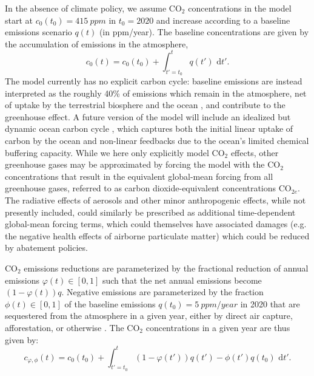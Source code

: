 \documentclass{article}
\begin{document}
In the absence of climate policy, we assume CO$_{2}$ concentrations in the model start at $c_{0}(t_{0}) = \SI{415}{ppm}$ in $t_{0}=2020$ and increase according to a baseline emissions scenario $q(t)$ (in ppm/year). The baseline concentrations are given by the accumulation of emissions in the atmosphere,
\begin{equation}
c_{0}(t) = c_{0}(t_{0}) + \int_{t'=t_{0}}^{t} q(t') \text{ d}t'.
\end{equation}
The model currently has no explicit carbon cycle: baseline emissions are instead interpreted as the roughly 40\% of emissions which remain in the atmosphere, net of uptake by the terrestrial biosphere and the ocean \citep{}, and contribute to the greenhouse effect. A future version of the model will include an idealized but dynamic ocean carbon cycle \citep[e.g.][]{Glotter2014}, which captures both the initial linear uptake of carbon by the ocean and non-linear feedbacks due to the ocean's limited chemical buffering capacity. While we here only explicitly model CO$_{2}$ effects, other greenhouse gases may be approximated by forcing the model with the CO$_{2}$ concentrations that result in the equivalent global-mean forcing from all greenhouse gases, referred to as carbon dioxide-equivalent concentrations CO$_{2e}$. The radiative effects of aerosols and other minor anthropogenic effects, while not presently included, could similarly be prescribed as additional time-dependent global-mean forcing terms, which could themselves have associated damages (e.g. the negative health effects of airborne particulate matter) which could be reduced by abatement policies.

CO$_{2}$ emissions reductions are parameterized by the fractional reduction of annual emissions $\varphi(t) \in [0,1]$ such that the net annual emissions become $(1-\varphi(t))q$. Negative emissions are parameterized by the fraction $\phi(t) \in [0,1]$ of the baseline emissions $q(t_{0}) = \SI{5}{ppm/year}$ in 2020 that are sequestered from the atmosphere in a given year, either by direct air capture, afforestation, or otherwise \citep{}. The CO$_{2}$ concentrations in a given year are thus given by:
\begin{equation}
    c_{\varphi, \phi}(t) = c_{0}(t_{0}) + \int_{t'=t_{0}}^{t} (1-\varphi(t'))q(t') - \phi(t')q(t_{0}) \text{ d}t'.\label{eq-CO2-conc}
\end{equation}
\end{document}
